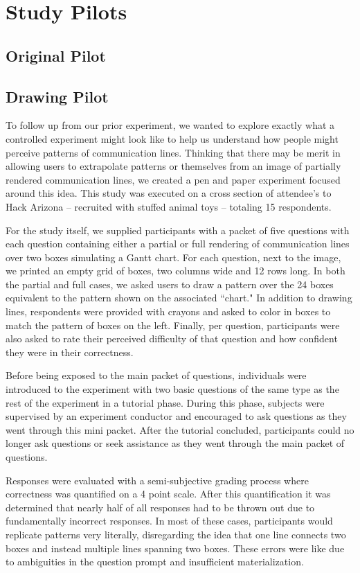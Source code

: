 \section{Study Pilots} 

\subsection{Original Pilot}


\subsection{Drawing Pilot}
To follow up from our prior experiment, we wanted to explore exactly what a controlled experiment might look like to help us understand how people might perceive patterns of communication lines. Thinking that there may be merit in allowing users to extrapolate patterns or themselves from an image of partially rendered communication lines, we created a pen and paper experiment focused around this idea. This study was executed on a cross section of attendee’s to Hack Arizona – recruited with stuffed animal toys – totaling 15 respondents.

For the study itself, we supplied participants with a packet of five questions with each question containing either a partial or full rendering of communication lines over two boxes simulating a Gantt chart. For each question, next to the image, we printed an empty grid of boxes, two columns wide and 12 rows long. In both the partial and full cases, we asked users to draw a pattern over the 24 boxes equivalent to the pattern shown on the associated ``chart." In addition to drawing lines, respondents were provided with crayons and asked to color in boxes to match the pattern of boxes on the left. Finally, per question, participants were also asked to rate their perceived difficulty of that question and how confident they were in their correctness. 

Before being exposed to the main packet of questions, individuals were introduced to the experiment with two basic questions of the same type as the rest of the experiment in a tutorial phase. During this phase, subjects were supervised by an experiment conductor and encouraged to ask questions as they went through this mini packet. After the tutorial concluded, participants could no longer ask questions or seek assistance as they went through the main packet of questions.

Responses were evaluated with a semi-subjective grading process where correctness was quantified on a 4 point scale. After this quantification it was determined that nearly half of all responses had to be thrown out due to fundamentally incorrect responses. In most of these cases, participants would replicate patterns very literally, disregarding the idea that one line connects two boxes and instead multiple lines spanning two boxes. These errors were like due to ambiguities in the question prompt and insufficient materialization. 

